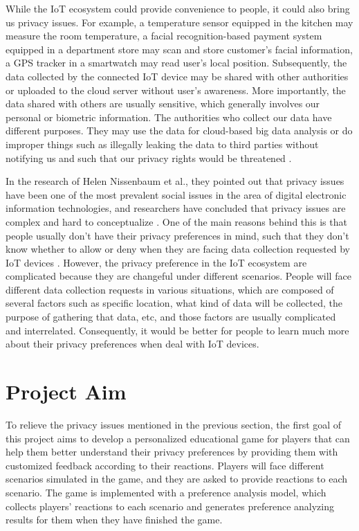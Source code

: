\documentclass[msc,deptreport,ai]{infthesis}      %
\begin{document}
While the IoT ecosystem could provide convenience to people, it could also bring us privacy issues. For example, a temperature sensor equipped in the kitchen may measure the room temperature, a facial recognition-based payment system equipped in a department store may scan and store customer's facial information, a GPS tracker in a smartwatch may read user's local position. Subsequently, the data collected by the connected IoT device may be shared with other authorities or uploaded to the cloud server without user's awareness. More importantly, the data shared with others are usually sensitive, which generally involves our personal or biometric information. The authorities who collect our data have different purposes. They may use the data for cloud-based big data analysis or do improper things such as illegally leaking the data to third parties without notifying us and such that our privacy rights would be threatened \cite{bigdata}.

In the research of Helen Nissenbaum et al., they pointed out that privacy issues have been one of the most prevalent social issues in the area of digital electronic information technologies, and researchers have concluded that privacy issues are complex and hard to conceptualize \cite{privacy, Daniel}. One of the main reasons behind this is that people usually don't have their privacy preferences in mind, such that they don't know whether to allow or deny when they are facing data collection requested by IoT devices \cite{PMID:25635091}. However, the privacy preference in the IoT ecosystem are complicated because they are changeful under different scenarios. People will face different data collection requests in various situations, which are composed of several factors such as specific location, what kind of data will be collected, the purpose of gathering that data, etc, and those factors are usually complicated and interrelated. Consequently, it would be better for people to learn much more about their privacy preferences when deal with IoT devices.

\section{Project Aim}
\label{section:aim}

To relieve the privacy issues mentioned in the previous section, the first goal of this project aims to develop a personalized educational game for players that can help them better understand their privacy preferences by providing them with customized feedback according to their reactions. Players will face different scenarios simulated in the game, and they are asked to provide reactions to each scenario. The game is implemented with a preference analysis model, which collects players' reactions to each scenario and generates preference analyzing results for them when they have finished the game.
\end{document}
